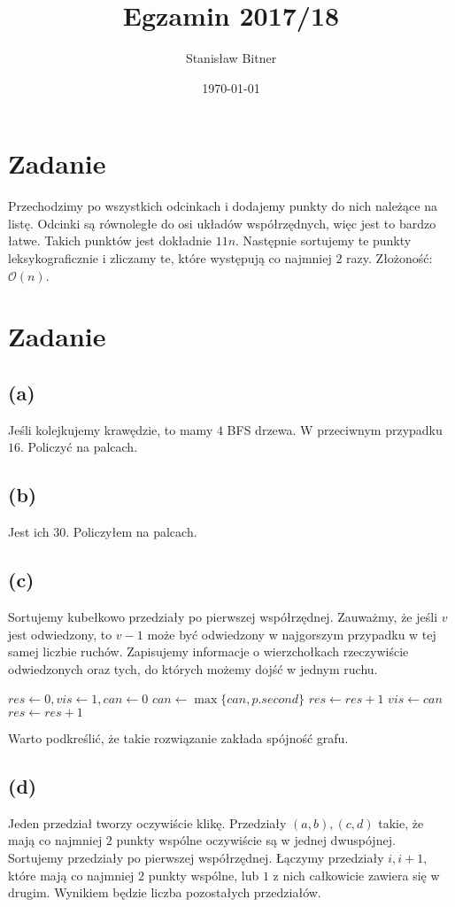 \documentclass[12pt, a4paper]{article}
\title{Egzamin 2017/18}
\author{Stanisław Bitner}
\date{\today}
\newcommand{\MCALO}{\mathcal{O}}
\newcounter{zadanie}
\newcommand{\zadanie}{\addtocounter{zadanie}{1}\section*{Zadanie \arabic{zadanie}}}
\begin{document}
\maketitle
\zadanie{}
Przechodzimy po wszystkich odcinkach i dodajemy punkty do nich należące na
listę. Odcinki są równoległe do osi układów współrzędnych, więc jest to bardzo
łatwe. Takich punktów jest dokładnie $11n$. Następnie sortujemy te punkty
leksykograficznie i zliczamy te, które występują co najmniej $2$ razy.
Złożoność: $\MCALO(n)$.

\zadanie{}
\subsection*{(a)}
Jeśli kolejkujemy krawędzie, to mamy $4$ BFS drzewa. W przeciwnym przypadku
$16$. Policzyć na palcach.

\subsection*{(b)}
Jest ich $30$. Policzyłem na palcach.

\subsection*{(c)}
Sortujemy kubełkowo przedziały po pierwszej współrzędnej. Zauważmy, że jeśli
$v$ jest odwiedzony, to $v-1$ może być odwiedzony w najgorszym przypadku w tej
samej liczbie ruchów. Zapisujemy informacje o wierzchołkach rzeczywiście odwiedzonych
oraz tych, do których możemy dojść w jednym ruchu.
\begin{algorithmic}

  \State $res \gets 0, vis \gets 1, can \gets 0$
      \State $can \gets \max\{can, p.second\}$
    \Else
      \State $res \gets res+1$
      \State $vis \gets can$
    \EndIf
  \EndFor
    \State $res \gets res + 1$
  \EndIf

\end{algorithmic}
Warto podkreślić, że takie rozwiązanie zakłada spójność grafu.

\subsection*{(d)}
Jeden przedział tworzy oczywiście klikę. Przedziały $(a,b), (c,d)$ takie, że
mają co najmniej $2$ punkty wspólne oczywiście są w jednej dwuspójnej.
Sortujemy przedziały po pierwszej współrzędnej. Łączymy przedziały $i,i+1$,
które mają co najmniej $2$ punkty wspólne, lub $1$ z nich całkowicie zawiera
się w drugim. Wynikiem będzie liczba pozostałych przedziałów.
\end{document}
